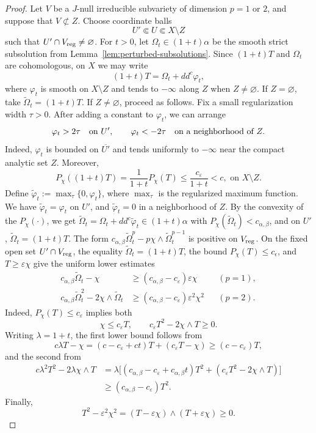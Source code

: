 \documentclass[reqno]{amsart}
\theoremstyle{remark}
\newcommand{\ddc}{dd^c}
\theoremstyle{plain}
\begin{document}
\begin{proof}
Let $V$ be a $J$-null irreducible subvariety of dimension
$p=1$ or $2$, and suppose that $V\not\subset Z$.  Choose
coordinate balls
\[
 U'\Subset U\Subset X\setminus Z
\]
such that $U'\cap V_{\rm reg}\neq\varnothing$.
For $t>0$, let $\Omega_t\in(1+t)\alpha$ be the smooth strict
subsolution from Lemma~\ref{lem:perturbed-subsolutions}.  Since
$(1+t)T$ and $\Omega_t$ are cohomologous, on $X$ we may write
\[
 (1+t)T=\Omega_t+\ddc\varphi_t,
\]
where $\varphi_t$ is smooth on $X\setminus Z$ and tends to
$-\infty$ along $Z$ when $Z\neq\varnothing$.  If
$Z=\varnothing$, take $\widetilde\Omega_t=(1+t)T$.  If
$Z\neq\varnothing$, proceed as follows.
Fix a small regularization width $\tau>0$.  After adding a constant
to $\varphi_t$, we can
arrange
\[
 \varphi_t>2\tau\quad\hbox{on }U',
 \qquad
 \varphi_t<-2\tau\quad\hbox{on a neighborhood of }Z.
\]
Indeed, $\varphi_t$ is bounded on $\overline{U'}$ and tends
uniformly to $-\infty$ near the compact analytic set $Z$.  Moreover,
\[
 P_\chi((1+t)T)=\frac1{1+t}P_\chi(T)
 \leq\frac{c_\varepsilon}{1+t}<c, \text{ on } X\setminus Z.
\]
    Define $\tilde{\varphi}_t:=\max_{\tau}\{0,\varphi_t\}$, where $\max_\tau$ is the regularized maximum function. We have $\tilde{\varphi}_t=\varphi_t$ on $U'$, and $\tilde{\varphi}_t=0$ in a neighborhood of $Z$. By the convexity of the $P_\chi(\cdot)$, we get $\tilde{\Omega}_t=\Omega_t+\ddc\tilde{\varphi}_t\in (1+t)\alpha$ with $P_\chi(\tilde{\Omega}_t)<c_{\alpha,\beta}$, and on $U'$, $\tilde{\Omega}_t=(1+t)T$.
    The form $
 c_{\alpha,\beta}\widetilde\Omega_t^p
   -p\chi\wedge\widetilde\Omega_t^{p-1}$ 
is positive on $V_{\rm reg}$.  On the fixed open set
$U'\cap V_{\rm reg}$, the equality
$\widetilde\Omega_t=(1+t)T$, the bound
$P_\chi(T)\leq c_\epsilon$, and
$T\geq\varepsilon\chi$ give the uniform lower estimates
\[
\begin{aligned}
 c_{\alpha,\beta}\widetilde\Omega_t-\chi
 &\geq(c_{\alpha,\beta}-c_\varepsilon)\varepsilon\chi
 &&(p=1),\\
 c_{\alpha,\beta}\widetilde\Omega_t^2
     -2\chi\wedge\widetilde\Omega_t
 &\geq(c_{\alpha,\beta}-c_\varepsilon)\varepsilon^2\chi^2
 &&(p=2).
\end{aligned}
\]
Indeed, $P_\chi(T)\leq c_\varepsilon$ implies both
\[
 \chi\leq c_\varepsilon T,\qquad
 c_\varepsilon T^2-2\chi\wedge T\geq0.
\]
Writing $\lambda=1+t$, the first lower bound follows from
\[
 c\lambda T-\chi
 =(c-c_\varepsilon+ct)T+(c_\varepsilon T-\chi)
 \geq(c-c_\varepsilon)T,
\]
and the second from
\[
\begin{aligned}
 c\lambda^2T^2-2\lambda\chi\wedge T
 &=\lambda\bigl[
   (c_{\alpha,\beta}-c_\varepsilon+c_{\alpha,\beta}t)T^2
   +(c_\varepsilon T^2-2\chi\wedge T)\bigr]\\
 &\geq(c_{\alpha,\beta}-c_\varepsilon)T^2.
\end{aligned}
\]
Finally,
\[
 T^2-\varepsilon^2\chi^2
 =(T-\varepsilon\chi)\wedge(T+\varepsilon\chi)\geq0.
\]


\end{proof}
\end{document}
